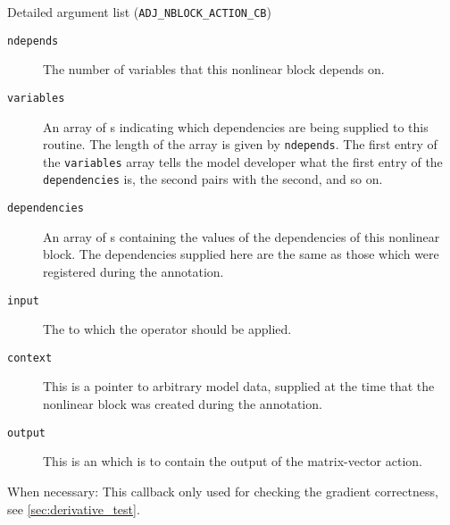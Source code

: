 \begin{boxwithtitle}{Detailed argument list (\texttt{ADJ_NBLOCK_ACTION_CB})}
\begin{description}
\item[\texttt{ndepends}] The number of variables that this nonlinear block depends on.
\item[\texttt{variables}] An array of s indicating which dependencies are being supplied to this routine. The length of the
array is given by \texttt{ndepends}. The first entry of the \texttt{variables} array
tells the model developer what the first entry of the \texttt{dependencies} is, the second pairs with the second, and so on.
\item[\texttt{dependencies}] An array of s containing the values of the dependencies of this nonlinear block. The dependencies supplied
here are the same as those which were registered during the annotation.
\item[\texttt{input}] The  to which the operator should be applied.
\item[\texttt{context}] This is a pointer to arbitrary model data, supplied at the time that the nonlinear block was created during the annotation.
\item[\texttt{output}] This is an  which is to contain the output of the matrix-vector action.
\end{description}
\end{boxwithtitle}

When necessary: 
This callback only used for checking the gradient correctness, see \autoref{sec:derivative_test}.

